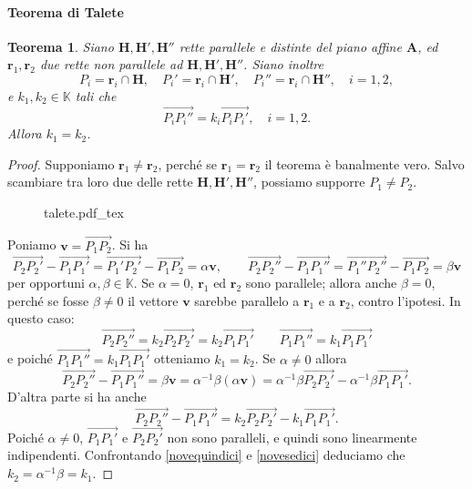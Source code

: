 \documentclass{article}
\theoremstyle{plain}
\newtheorem{thm}{Teorema}[section]
\theoremstyle{definition}
\theoremstyle{remark}
\newcommand{\incfig}[2][\columnwidth]{%
    \def\svgwidth{#1}
    {#2.pdf_tex}
}
\begin{document}
\paragraph{Teorema di Talete}
\begin{bxthm}
\begin{thm}
Siano $\mathbf{H}, \mathbf{H}', \mathbf{H}''$ rette parallele e distinte del piano affine $\mathbf{A}$, ed $\mathbf{r}_1, \mathbf{r}_2$ due rette non parallele ad $\mathbf{H}, \mathbf{H}', \mathbf{H}''$. 
Siano inoltre
\[P_i = \mathbf{r}_i \cap \mathbf{H}, \quad P_i' = \mathbf{r}_i \cap \mathbf{H}', \quad P_i'' = \mathbf{r}_i \cap \mathbf{H}'', \quad i = 1, 2,\]
e $k_1, k_2 \in \mathbb{K}$ tali che
\[\overrightarrow{P_i P_i''} = k_i \overrightarrow{P_i P_i'}, \quad i = 1, 2.\]
Allora $k_1 = k_2$.    
\end{thm}
\end{bxthm}
\begin{proof}
Supponiamo $\mathbf{r}_1 \neq \mathbf{r}_2$, perché se $\mathbf{r}_1 = \mathbf{r}_2$ il teorema è banalmente vero.  
Salvo scambiare tra loro due delle rette $\mathbf{H}, \mathbf{H}', \mathbf{H}''$, possiamo supporre $P_1 \neq P_2$.
\begin{figure}[H]
    \centering
    \incfig[0.7\linewidth]{talete}
\end{figure}
Poniamo $\mathbf{v} = \overrightarrow{P_1 P_2}$. Si ha
\[\overrightarrow{P_2P_2'}-\overrightarrow{P_1P_1'}=\overrightarrow{P_1'P_2'}-\overrightarrow{P_1P_2}=\alpha\mathbf{v},\quad\quad \overrightarrow{P_2P_2''}-\overrightarrow{P_1P_1''}=\overrightarrow{P_1''P_2''}-\overrightarrow{P_1P_2}=\beta\mathbf{v}\]
per opportuni $\alpha, \beta \in \mathbb{K}$.
Se $\alpha = 0$, $\mathbf{r}_1$ ed $\mathbf{r}_2$ sono parallele; allora anche $\beta = 0$, perché se fosse $\beta \neq 0$ il vettore $\mathbf{v}$ sarebbe parallelo a $\mathbf{r}_1$ e a $\mathbf{r}_2$, contro l'ipotesi. 
In questo caso:
\[\overrightarrow{P_2P_2''}=k_2\overrightarrow{P_2P_2'}=k_2\overrightarrow{P_1P_1'}\quad\quad\overrightarrow{P_1P_1''}=k_1\overrightarrow{P_1P_1'}\]
e poiché $\overrightarrow{P_1P_1''}=k_1\overrightarrow{P_1P_1'}$ otteniamo $k_1 = k_2$.
Se $\alpha \neq 0$ allora
\begin{equation}\label{novequindici}
\overrightarrow{P_2P_2''} - \overrightarrow{P_1P_1''} = \beta \mathbf{v} = \alpha^{-1} \beta (\alpha \mathbf{v}) = \alpha^{-1} \beta \overrightarrow{P_2P_2'} - \alpha^{-1} \beta \overrightarrow{P_1P_1'}.
\end{equation}
D'altra parte si ha anche
\begin{equation}\label{novesedici}
\overrightarrow{P_2P_2''}-\overrightarrow{P_1P_1''}=k_2\overrightarrow{P_2P_2'}-k_1\overrightarrow{P_1P_1'}.
\end{equation}
Poiché $\alpha \neq 0$, $\overrightarrow{P_1P_1'}$ e $\overrightarrow{P_2P_2'}$ non sono paralleli, e quindi sono linearmente indipendenti. Confrontando \ref{novequindici} e \ref{novesedici} deduciamo che $k_2 = \alpha^{-1} \beta = k_1$.
\end{proof}
\end{document}
